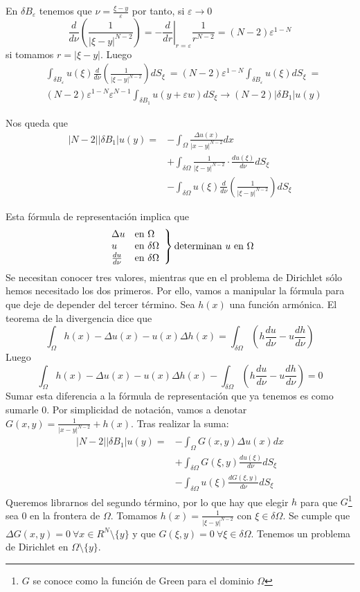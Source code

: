 En $\delta B_\varepsilon$ tenemos que $\nu = \frac{\xi-y}{\varepsilon}$ por tanto, si $\varepsilon\to0$
$$\frac{d}{d\nu}\left(\frac{1}{|\xi-y|^{N-2}}\right) = -\left.\frac{d}{dr}\right|_{r=\varepsilon}\frac{1}{r^{N-2}} = (N-2)\varepsilon^{1-N}$$ si tomamos $r=|\xi-y|$. Luego
\begin{align*}
& \int_{\delta B_\varepsilon} u(\xi)\frac{d}{d\nu}\left(\frac{1}{|\xi-y|^{N-2}}\right)dS_\xi \ = (N-2)\varepsilon^{1-N}\int_{\delta B_\varepsilon}u(\xi)dS_\xi \ = \\
& (N-2)\varepsilon^{1-N}\varepsilon^{N-1}\int_{\delta B_1}u(y+\varepsilon w)dS_\xi\to(N-2)|\delta B_1|u(y)
\end{align*}

Nos queda que 
\begin{align*}
|N-2||\delta B_1|u(y) = & -\int_{\Omega}\frac{\Delta u(x)}{|x-y|^{N-2}}dx\\
& + \int_{\delta\Omega} \frac{1}{|\xi-y|^{N-2}}\cdot\frac{du(\xi)}{d\nu}dS_\xi\\
& -\int_{\delta\Omega}u(\xi)\frac{d}{d\nu}\left(\frac{1}{|\xi-y|^{N-2}}\right)dS_\xi
\end{align*}

Esta fórmula de representación implica que
\begin{equation*}
\left.
\begin{array}{l l}
\Delta u & \text{en } \Omega\\
u & \text{en } \delta\Omega\\
\frac{du}{d\nu} & \text{en } \delta\Omega\\
\end{array}
\right\} \text{determinan } u \text{ en } \Omega
\end{equation*}
Se necesitan conocer tres valores, mientras que en el problema de Dirichlet sólo hemos necesitado los dos primeros. Por ello, vamos a manipular la fórmula para que deje de depender del tercer término. Sea $h(x)$ una función armónica. El teorema de la divergencia dice que
$$\int_{\Omega}h(x)-\Delta u(x) - u(x)\Delta h(x) = \int_{\delta\Omega}\left(h\frac{du}{d\nu}-u\frac{dh}{d\nu}\right)$$
Luego 
$$\int_{\Omega}h(x)-\Delta u(x) - u(x)\Delta h(x) - \int_{\delta\Omega}\left(h\frac{du}{d\nu}-u\frac{dh}{d\nu}\right) = 0$$
Sumar esta diferencia a la fórmula de representación que ya tenemos es como sumarle 0. Por simplicidad de notación, vamos a denotar $G(x,y) = \frac{1}{|x-y|^{N-2}}+h(x)$. Tras realizar la suma:
\begin{align*}
|N-2||\delta B_1|u(y) = & -\int_{\Omega}G(x,y)\Delta u(x)dx\\
& + \int_{\delta\Omega} G(\xi, y)\frac{du(\xi)}{d\nu}dS_\xi\\
& -\int_{\delta\Omega}u(\xi)\frac{dG(\xi, y)}{d\nu}dS_\xi
\end{align*}
Queremos librarnos del segundo término, por lo que hay que elegir $h$ para que $G$\footnote{$G$ se conoce como la función de Green para el dominio $\Omega$} sea $0$ en la frontera de $\Omega$. Tomamos $h(x) = \frac{1}{|\xi-y|^{N-2}}$ con $\xi\in\delta\Omega$. Se cumple que $\Delta G(x,y) = 0 \ \forall x \in R^N\setminus \{y\}$ y que $G(\xi,y) = 0 \ \forall \xi \in \delta \Omega$. Tenemos un problema de Dirichlet en $\Omega\setminus\{y\}$.

